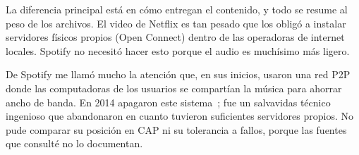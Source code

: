 La diferencia principal está en cómo entregan el contenido, y todo se resume al peso de los archivos. El video de Netflix es tan pesado que los obligó a instalar servidores físicos propios (Open Connect) dentro de las operadoras de internet locales. Spotify no necesitó hacer esto porque el audio es muchísimo más ligero.

De Spotify me llamó mucho la atención que, en sus inicios, usaron una red P2P donde las computadoras de los usuarios se compartían la música para ahorrar ancho de banda. En 2014 apagaron este sistema~\cite{TechCrunch_Spotify2014}; fue un salvavidas técnico ingenioso que abandonaron en cuanto tuvieron suficientes servidores propios. No pude comparar su posición en CAP ni su tolerancia a fallos, porque las fuentes que consulté no lo documentan.

